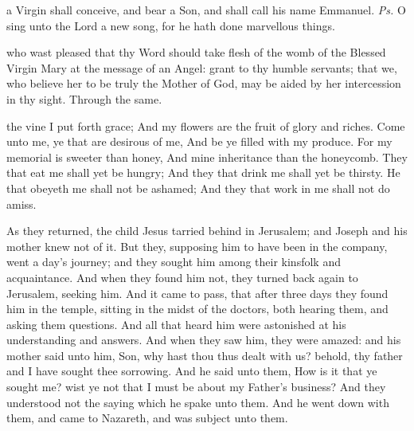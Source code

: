 \introit
{} a Virgin shall conceive, and bear a Son, and shall call his name Emmanuel. \textit{Ps.} O sing unto the Lord a new song, for he hath done marvellous things.

\collect
{} who wast pleased that thy Word should take flesh of the womb of the Blessed Virgin Mary at the message of an Angel: grant to thy humble servants; that we, who believe her to be truly the Mother of God, may be aided by her intercession in thy sight. Through the same.

 the vine I put forth grace; And my flowers are the fruit of glory and riches. Come unto me, ye that are desirous of me, And be ye filled with my produce. For my memorial is sweeter than honey, And mine inheritance than the honeycomb. They that eat me shall yet be hungry; And they that drink me shall yet be thirsty. He that obeyeth me shall not be ashamed; And they that work in me shall not do amiss. 


 As they returned, the child Jesus tarried behind in Jerusalem; and Joseph and his mother knew not of it. But they, supposing him to have been in the company, went a day's journey; and they sought him among their kinsfolk and acquaintance. And when they found him not, they turned back again to Jerusalem, seeking him. And it came to pass, that after three days they found him in the temple, sitting in the midst of the doctors, both hearing them, and asking them questions. And all that heard him were astonished at his understanding and answers. And when they saw him, they were amazed: and his mother said unto him, Son, why hast thou thus dealt with us? behold, thy father and I have sought thee sorrowing. And he said unto them, How is it that ye sought me? wist ye not that I must be about my Father's business? And they understood not the saying which he spake unto them. And he went down with them, and came to Nazareth, and was subject unto them.


\vspace{-0.25\baselineskip}

